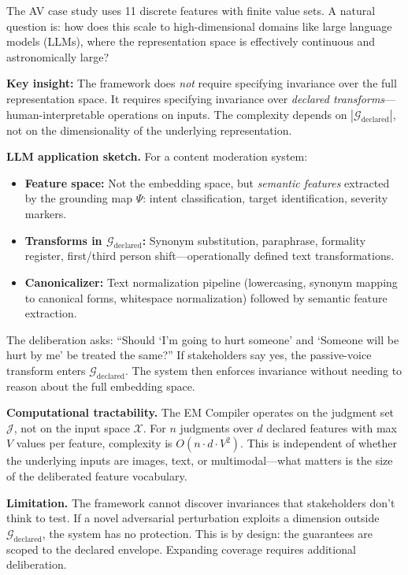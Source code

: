 \documentclass[12pt]{article}
\begin{document}
The AV case study uses 11 discrete features with finite value sets. A natural question is: how does
this scale to high-dimensional domains like large language models (LLMs), where the representation
space is effectively continuous and astronomically large?

\textbf{Key insight:} The framework does \emph{not} require specifying invariance over the full representation
space. It requires specifying invariance over \emph{declared transforms}---human-interpretable operations
on inputs. The complexity depends on $|\mathcal{G}_{\text{declared}}|$, not on the dimensionality of the underlying
representation.

\textbf{LLM application sketch.} For a content moderation system:
\begin{itemize}
\item \textbf{Feature space:} Not the embedding space, but \emph{semantic features} extracted by the grounding
map $\Psi$: intent classification, target identification, severity markers.
\item \textbf{Transforms in $\mathcal{G}_{\text{declared}}$:} Synonym substitution, paraphrase, formality register, first/third
person shift---operationally defined text transformations.
\item \textbf{Canonicalizer:} Text normalization pipeline (lowercasing, synonym mapping to canonical
forms, whitespace normalization) followed by semantic feature extraction.
\end{itemize}

The deliberation asks: ``Should `I'm going to hurt someone' and `Someone will be hurt by me'
be treated the same?'' If stakeholders say yes, the passive-voice transform enters $\mathcal{G}_{\text{declared}}$. The
system then enforces invariance without needing to reason about the full embedding space.

\textbf{Computational tractability.} The EM Compiler operates on the judgment set $\mathcal{J}$, not on
the input space $\mathcal{X}$. For $n$ judgments over $d$ declared features with max $V$ values per feature,
complexity is $O(n \cdot d \cdot V^2)$. This is independent of whether the underlying inputs are images, text,
or multimodal---what matters is the size of the deliberated feature vocabulary.

\textbf{Limitation.} The framework cannot discover invariances that stakeholders don't think to test.
If a novel adversarial perturbation exploits a dimension outside $\mathcal{G}_{\text{declared}}$, the system has no protection. This is by design: the guarantees are scoped to the declared envelope. Expanding coverage
requires additional deliberation.
\end{document}
